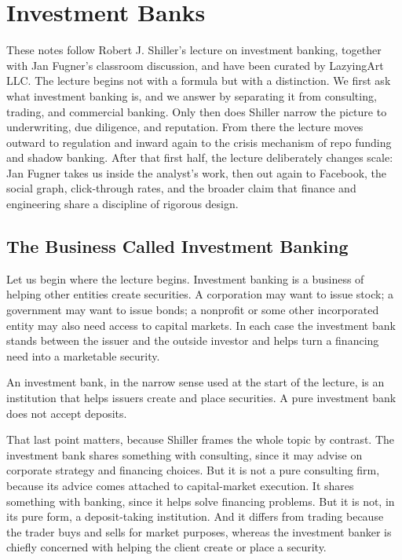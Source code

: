 \chapter{Investment Banks}

These notes follow Robert J. Shiller's lecture on investment banking, together with Jan Fugner's classroom discussion, and have been curated by LazyingArt LLC. The lecture begins not with a formula but with a distinction. We first ask what investment banking is, and we answer by separating it from consulting, trading, and commercial banking. Only then does Shiller narrow the picture to underwriting, due diligence, and reputation. From there the lecture moves outward to regulation and inward again to the crisis mechanism of repo funding and shadow banking. After that first half, the lecture deliberately changes scale: Jan Fugner takes us inside the analyst's work, then out again to Facebook, the social graph, click-through rates, and the broader claim that finance and engineering share a discipline of rigorous design.

\section{The Business Called Investment Banking}

Let us begin where the lecture begins. Investment banking is a business of helping other entities create securities. A corporation may want to issue stock; a government may want to issue bonds; a nonprofit or some other incorporated entity may also need access to capital markets. In each case the investment bank stands between the issuer and the outside investor and helps turn a financing need into a marketable security.

\begin{definition}
An investment bank, in the narrow sense used at the start of the lecture, is an institution that helps issuers create and place securities. A pure investment bank does not accept deposits.
\end{definition}

That last point matters, because Shiller frames the whole topic by contrast. The investment bank shares something with consulting, since it may advise on corporate strategy and financing choices. But it is not a pure consulting firm, because its advice comes attached to capital-market execution. It shares something with banking, since it helps solve financing problems. But it is not, in its pure form, a deposit-taking institution. And it differs from trading because the trader buys and sells for market purposes, whereas the investment banker is chiefly concerned with helping the client create or place a security.

